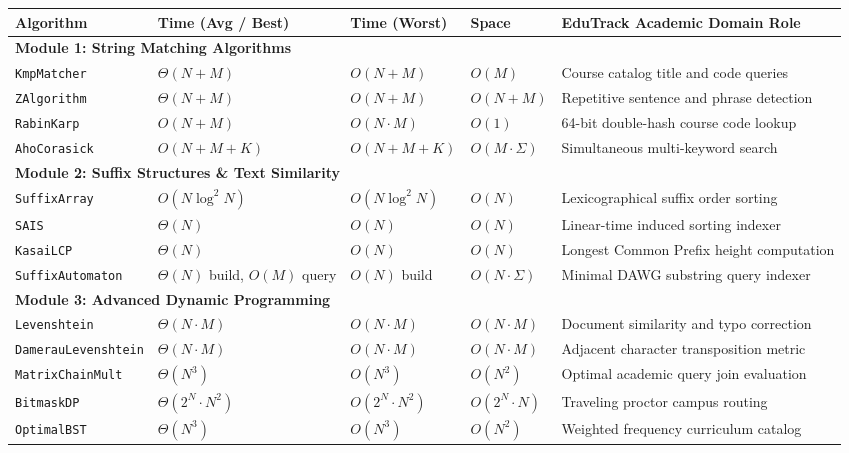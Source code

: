 \begin{table}[H]
\centering
\scriptsize
\begin{tabularx}{\textwidth}{llllp{4.2cm}}
\toprule
\textbf{Algorithm} & \textbf{Time (Avg / Best)} & \textbf{Time (Worst)} & \textbf{Space} & \textbf{EduTrack Academic Domain Role} \\
\midrule
\multicolumn{5}{l}{\textbf{Module 1: String Matching Algorithms}} \\
\texttt{KmpMatcher} & $\Theta(N + M)$ & $O(N + M)$ & $O(M)$ & Course catalog title and code queries \\
\texttt{ZAlgorithm} & $\Theta(N + M)$ & $O(N + M)$ & $O(N + M)$ & Repetitive sentence and phrase detection \\
\texttt{RabinKarp} & $O(N + M)$ & $O(N \cdot M)$ & $O(1)$ & 64-bit double-hash course code lookup \\
\texttt{AhoCorasick} & $O(N + M + K)$ & $O(N + M + K)$ & $O(M \cdot \Sigma)$ & Simultaneous multi-keyword search \\
\midrule
\multicolumn{5}{l}{\textbf{Module 2: Suffix Structures \& Text Similarity}} \\
\texttt{SuffixArray} & $O(N \log^2 N)$ & $O(N \log^2 N)$ & $O(N)$ & Lexicographical suffix order sorting \\
\texttt{SAIS} & $\Theta(N)$ & $O(N)$ & $O(N)$ & Linear-time induced sorting indexer \\
\texttt{KasaiLCP} & $\Theta(N)$ & $O(N)$ & $O(N)$ & Longest Common Prefix height computation \\
\texttt{SuffixAutomaton} & $\Theta(N)$ build, $O(M)$ query & $O(N)$ build & $O(N \cdot \Sigma)$ & Minimal DAWG substring query indexer \\
\midrule
\multicolumn{5}{l}{\textbf{Module 3: Advanced Dynamic Programming}} \\
\texttt{Levenshtein} & $\Theta(N \cdot M)$ & $O(N \cdot M)$ & $O(N \cdot M)$ & Document similarity and typo correction \\
\texttt{DamerauLevenshtein} & $\Theta(N \cdot M)$ & $O(N \cdot M)$ & $O(N \cdot M)$ & Adjacent character transposition metric \\
\texttt{MatrixChainMult} & $\Theta(N^3)$ & $O(N^3)$ & $O(N^2)$ & Optimal academic query join evaluation \\
\texttt{BitmaskDP} & $\Theta(2^N \cdot N^2)$ & $O(2^N \cdot N^2)$ & $O(2^N \cdot N)$ & Traveling proctor campus routing \\
\texttt{OptimalBST} & $\Theta(N^3)$ & $O(N^3)$ & $O(N^2)$ & Weighted frequency curriculum catalog \\

\end{tabularx}
\end{table}
